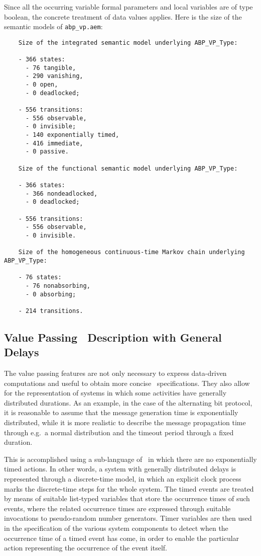 Since all the occurring variable formal parameters and local variables are of type boolean, the concrete
treatment of data values applies. Here is the size of the semantic models of {\tt abp\_vp.aem}:

	\begin{verbatim}
    Size of the integrated semantic model underlying ABP_VP_Type:

    - 366 states: 
      - 76 tangible, 
      - 290 vanishing, 
      - 0 open, 
      - 0 deadlocked;

    - 556 transitions:
      - 556 observable,
      - 0 invisible;
      - 140 exponentially timed,
      - 416 immediate,
      - 0 passive.

    Size of the functional semantic model underlying ABP_VP_Type:

    - 366 states: 
      - 366 nondeadlocked, 
      - 0 deadlocked;

    - 556 transitions:
      - 556 observable,
      - 0 invisible.

    Size of the homogeneous continuous-time Markov chain underlying ABP_VP_Type:

    - 76 states: 
      - 76 nonabsorbing, 
      - 0 absorbing;

    - 214 transitions.
	\end{verbatim}


\subsection{Value Passing \aemilia\ Description with General Delays}\label{abp_gd}

The value passing features are not only necessary to express data-driven computations and useful to obtain
more concise \aemilia\ specifications. They also allow for the representation of systems in which some
activities have generally distributed durations. As an example, in the case of the alternating bit protocol,
it is reasonable to assume that the message generation time is exponentially distributed, while it is more
realistic to describe the message propagation time through e.g.\ a normal distribution and the timeout
period through a fixed duration.

This is accomplished using a sub-language of \aemilia\ in which there are no exponentially timed actions. In
other words, a system with generally distributed delays is represented through a discrete-time model, in
which an explicit clock process marks the discrete-time steps for the whole system. The timed events are
treated by means of suitable list-typed variables that store the occurrence times of such events, where the
related occurrence times are expressed through suitable invocations to pseudo-random number generators.
Timer variables are then used in the specification of the various system components to detect when the
occurrence time of a timed event has come, in order to enable the particular action representing the
occurrence of the event itself.

